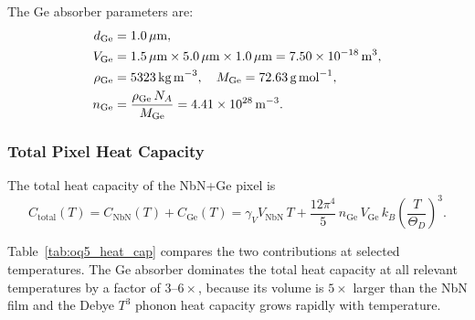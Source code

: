 The Ge absorber parameters are:
\begin{align}
  d_\mathrm{Ge}   &= 1.0\,\mu\text{m}, \notag \\
  V_\mathrm{Ge}   &= 1.5\,\mu\text{m} \times 5.0\,\mu\text{m}
                      \times 1.0\,\mu\text{m}
                    = 7.50 \times 10^{-18}\,\text{m}^3, \notag \\
  \rho_\mathrm{Ge} &= 5323\,\text{kg\,m}^{-3}, \quad
  M_\mathrm{Ge}    = 72.63\,\text{g\,mol}^{-1}, \notag \\
  n_\mathrm{Ge}   &= \frac{\rho_\mathrm{Ge}\,N_A}{M_\mathrm{Ge}}
                    = 4.41 \times 10^{28}\,\text{m}^{-3}.
  \label{eq:oq5_Ge_params}
\end{align}

\subsubsection{Total Pixel Heat Capacity}

The total heat capacity of the NbN+Ge pixel is
\begin{equation}
  C_\mathrm{total}(T) = C_\mathrm{NbN}(T) + C_\mathrm{Ge}(T)
  = \gamma_V V_\mathrm{NbN}\,T
    + \frac{12\pi^4}{5}\,n_\mathrm{Ge}\,V_\mathrm{Ge}\,k_B
      \left(\frac{T}{\Theta_D}\right)^3.
  \label{eq:oq5_C_total}
\end{equation}

Table~\ref{tab:oq5_heat_cap} compares the two contributions at selected
temperatures. The Ge absorber dominates the total heat capacity at all
relevant temperatures by a factor of $3$--$6\times$, because its volume is
$5\times$ larger than the NbN film and the Debye $T^3$ phonon heat capacity
grows rapidly with temperature.

